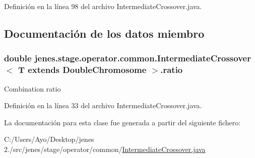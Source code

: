 Definición en la línea 98 del archivo Intermediate\-Crossover.\-java.



\subsection{Documentación de los datos miembro}
\hypertarget{classjenes_1_1stage_1_1operator_1_1common_1_1_intermediate_crossover_3_01_t_01extends_01_double_chromosome_01_4_a00aeef350858cb4ee81f06f7cf7a4c06}{
\subsubsection[{ratio}]{\setlength{\rightskip}{0pt plus 5cm}double jenes.\-stage.\-operator.\-common.\-Intermediate\-Crossover$<$ T extends {\bf Double\-Chromosome} $>$.ratio\hspace{0.3cm}{\ttfamily [protected]}}}\label{classjenes_1_1stage_1_1operator_1_1common_1_1_intermediate_crossover_3_01_t_01extends_01_double_chromosome_01_4_a00aeef350858cb4ee81f06f7cf7a4c06}
Combination ratio 

Definición en la línea 33 del archivo Intermediate\-Crossover.\-java.



La documentación para esta clase fue generada a partir del siguiente fichero\-:\begin{DoxyCompactItemize}
\item 
C\-:/\-Users/\-Ayo/\-Desktop/jenes 2./src/jenes/stage/operator/common/\hyperlink{_intermediate_crossover_8java}{Intermediate\-Crossover.\-java}\end{DoxyCompactItemize}
